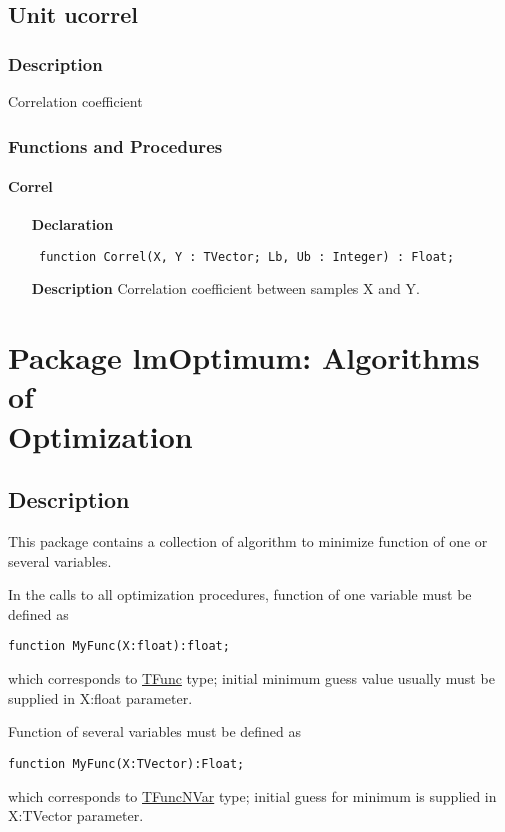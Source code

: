 \documentclass[12pt,a4paper,oneside]{report}
\newcommand{\declarationitem}[1]{\textbf{#1}}
\newcommand{\descriptiontitle}[1]{\textbf{#1}}
\newcommand{\code}[1]{\texttt{#1}}
\begin{document}
\section{Unit ucorrel}
\label{ucorrel}
\subsection{Description}
Correlation coefficient
\subsection{Functions and Procedures}
\subsubsection{Correl}
\label{ucorrel-Correl}
\begin{itemize}\item[\declarationitem{Declaration}\hfill]
	\begin{flushleft}
		\code{
			function Correl(X, Y : TVector; Lb, Ub : Integer) : Float;}
	\end{flushleft}
	\item[\descriptiontitle{Description}]
	Correlation coefficient between samples X and Y.
\end{itemize}
\chapter[Package lmOptimum]{Package lmOptimum: Algorithms of \\ Optimization }\label{package-lmOptimum}
\section{Description}
This package contains a collection of algorithm to minimize function of one or several variables. 

\noindent In the calls to all optimization procedures, function of one variable must be defined as 

\code{function MyFunc(X:float):float;} 

\noindent which corresponds to \hyperref[utypes-TFunc]{TFunc} type; initial minimum guess value usually must be supplied in X:float parameter.

\noindent Function of several variables must be defined as 

\code{function MyFunc(X:TVector):Float;}

\noindent which corresponds to \hyperref[utypes-TFuncNVar]{TFuncNVar} type; initial guess for minimum is supplied in X:TVector parameter.
\end{document}

